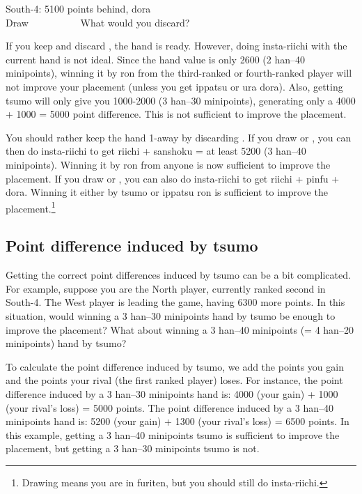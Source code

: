 \bigskip
\begin{itembox}[r]{South-4: 5100 points behind, {\jap dora} {\Large{}}}
\bp
{}~~\\
\hfill\footnotesize{Draw~~~~~~~~~~}
\ep
\vspace{-17pt}
What would you discard?
\end{itembox}
\noindent If you keep {\LARGE{}} and discard {\LARGE{}}, the hand is ready. However, doing insta-riichi with the current hand is not ideal. Since the hand value is only 2600 (2 {\jap han}--40 minipoints), winning it by {\jap ron} from the third-ranked or fourth-ranked player will not improve your placement (unless you get {\jap ippatsu} or {\jap ura dora}). Also, getting {\jap tsumo} will only give you 1000-2000 (3 {\jap han}--30 minipoints), generating only a 4000 + 1000 = 5000 point difference. This is not sufficient to improve the placement.

\bigskip
You should rather keep the hand 1-away by discarding {\LARGE{}}. If you draw {\LARGE{}} or {\LARGE{}}, you can then do insta-riichi to get riichi + {\jap sanshoku} = at least 5200 (3 {\jap han}--40 minipoints). Winning it by {\jap ron} from anyone is now sufficient to improve the placement. If you draw {\LARGE{}} or {\LARGE{}}, you can also do insta-riichi to get riichi + {\jap pinfu} + {\jap dora}. Winning it either by {\jap tsumo} or {\jap ippatsu ron} is sufficient to improve the placement.\footnote{Drawing  means you are in {\jap furiten}, but you should still do insta-riichi.}

\subsection*{Point difference induced by {\jap tsumo}}
Getting the correct point differences induced by {\jap tsumo} can be a bit complicated. For example, suppose you are the North player, currently ranked second in South-4. The West player is leading the game, having 6300 more points. In this situation, would winning a 3 {\jap han}--30 minipoints hand by {\jap tsumo} be enough to improve the placement? What about winning a 3 {\jap han}--40 minipoints (= 4 {\jap han}--20 minipoints) hand by {\jap tsumo}?

\bigskip
To calculate the point difference induced by {\jap tsumo}, we add the points you gain and the points your rival (the first ranked player) loses. For instance, the point difference induced by a 3 {\jap han}--30 minipoints hand is: 4000 (your gain) + 1000 (your rival's loss) = 5000 points. The point difference induced by a 3 {\jap han}--40 minipoints hand is: 5200 (your gain) + 1300 (your rival's loss) = 6500 points.
In this example, getting a 3 {\jap han}--40 minipoints {\jap tsumo} is sufficient to improve the placement, but getting a 3 {\jap han}--30 minipoints {\jap tsumo} is not.

